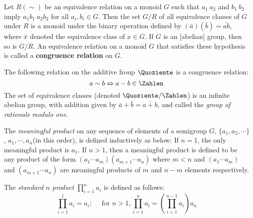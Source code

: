 \begin{Theorem}
	Let $ R(\sim) $ be an equivalence relation on a monoid $ G $ such that $ a_1~a_2 $ and $ b_1~b_2 $ imply $ a_1 b_1 ~ a_2 b_2 $ for all $ a_i, b_i \in G $. Then the set $ G/R $ of all equivalence classes of $ G $ under $ R $ is a monoid under the binary operation defined by $ (\bar{a})(\bar{b})=\bar{ab} $, where $ \bar{x} $ denoted the equivalence class of $ x \in G $. If $ G $ is an [abelian] group, then so is $ G/R $.\newpara
	An equivalence relation on a monoid $ G $ that satisfies these hypothesis is called a \textbf{congruence relation} on $ G $.
	
\end{Theorem}
\begin{Example}
	The following relation on the additive froup $ \Quoziente $ is a congruence relation:
	\begin{equation}
		a \sim b \Leftrightarrow a-b \in \Zahlen \nonumber
	\end{equation}
	The set of equivalence classes (denoted $ \Quoziente / \Zahlen $) is an infinite abelian group, with addition given by $ \bar{a}+\bar{b}=\bar{a+b} $, and called the \textit{group of rationals modulo one}.
\end{Example}
\begin{Definition}
	The \textit{meaningful product} on any sequence of elements of a semigroup $ G $, $ \{a_1,a_2,\cdots\} $, $ a_1,\cdots,a_n $(in this order), is defined inductively as below: If $ n=1 $, the only meaningful product is $ a_1 $. If $ n>1 $, then a meaningful product is defined to be any product of the form $ (a_1\cdots a_m)(a_{m+1}\cdots a_n) $ where $ m<n $ and $ (a_1\cdots a_m) $ and $ (a_{m+1}\cdots a_n) $ are meaningful products of $ m $ and $ n-m $ elements respectively.
\end{Definition}
\begin{Definition}
	The \textit{standard $ n $ product} $ \prod_{i=1}^{n}a_i $ is defined as follows:
	\begin{equation}
		\prod_{i=1}^{1}a_i=a_i;\quad\text{ for }n>1,\prod_{i=1}^{n}a_i = (\prod_{i=1}^{n-1}a_i)a_n \nonumber
	\end{equation}
\end{Definition}

